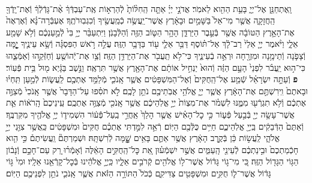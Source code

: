 \documentclass[twoside, openany, parskip=half, 11pt]{book}
\begin{document}
\begin{footnotesize}
\begin{multicols}{2}
\\
וָֽאֶתְחַנַּ֖ן אֶל־יְיָ֑ בָּעֵ֥ת הַהִ֖וא לֵאמֹֽר׃ אֲדֹנָ֣י יְיָ֗ אַתָּ֤ה הַֽחִלּ֨וֹתָ֙ לְֿהַרְא֣וֹת אֶֽת־עַבְדְּֿךָ֔ אֶ֨ת־גָּדְֿלְֿךָ֔ וְֿאֶת־יָֽדְֿךָ֖ הַֽחֲזָקָ֑ה אֲשֶׁ֤ר מִי־אֵל֙ בַּשָּׁמַ֣יִם וּבָאָ֔רֶץ אֲשֶׁר־יַֽעֲשֶׂ֥ה כְֿמַֽעֲשֶׂ֖יךָ וְֿכִגְבֽוּרֹתֶֽךָ׃ אֶעְבְּֿרָה־נָּ֗א וְֿאֶרְאֶה֙ אֶת־הָאָ֣רֶץ הַטּוֹבָ֔ה אֲשֶׁ֖ר בְּֿעֵ֣בֶר הַיַּרְדֵּ֑ן הָהָ֥ר הַטּ֛וֹב הַזֶּ֖ה וְֿהַלְּֿבָנֹֽן׃  וַיִּתְעַבֵּ֨ר יְיָ֥ בִּי֙ לְֿמַ֣עַנְכֶ֔ם וְֿלֹ֥א שָׁמַ֖ע אֵלָ֑י וַיֹּ֨אמֶר יְיָ֤ אֵלַי֙ רַב־לָ֔ךְ אַל־תּ֗וֹסֶף דַּבֵּ֥ר אֵלַ֛י ע֖וֹד בַּדָּבָ֥ר הַזֶּֽה׃ עֲלֵ֣ה רֹ֣אשׁ הַפִּסְגָּ֗ה וְֿשָׂ֥א עֵינֶ֛יךָ יׇׇׇׇׇׇָ֧מָּה וְֿצָפֹ֛נָה וְֿתֵימָ֥נָה וּמִזְרָ֖חָה וּרְאֵ֣ה בְֿעֵינֶ֑יךָ כִּי־לֹ֥א תַֽעֲבֹ֖ר אֶת־הַיַּרְדֵּ֥ן הַזֶּֽה׃ וְֿצַ֥ו אֶת־יְֿהוֹשֻׁ֖עַ וְֿחַזְּֿקֵ֣הוּ וְֿאַמְּֿצֵ֑הוּ כִּי־ה֣וּא יַֽעֲבֹ֗ר לִפְנֵי֙ הָעָ֣ם הַזֶּ֔ה וְֿהוּא֙ יַנְחִ֣יל אוֹתָ֔ם אֶת־הָאָ֖רֶץ אֲשֶׁ֥ר תִּרְאֶֽה׃ וַנֵּ֣שֶׁב בַּגָּ֔יְא מ֖וּל בֵּ֥ית פְּֿעֽוֹר׃ \textbf{פ}
וְֿעַתָּ֣ה יִשְׂרָאֵ֗ל שְֿׁמַ֤ע אֶל־הַֽחֻקִּים֙ וְֿאֶל־הַמִּשְׁפָּטִ֔ים אֲשֶׁ֧ר אָֽנֹכִ֛י מְֿלַמֵּ֥ד אֶתְכֶ֖ם לַֽעֲשׂ֑וֹת לְֿמַ֣עַן תִּֽחְי֗וּ וּבָאתֶם֙ וִֽירִשְׁתֶּ֣ם אֶת־הָאָ֔רֶץ אֲשֶׁ֧ר יְיָ֛ אֱלֹהֵ֥י אֲבֹֽתֵיכֶ֖ם נֹתֵ֥ן לָכֶֽם׃ לֹ֣א תֹסִ֗פוּ עַל־הַדָּבָר֙ אֲשֶׁ֤ר אָֽנֹכִי֙ מְֿצַוֶּ֣ה אֶתְכֶ֔ם וְֿלֹ֥א תִגְרְֿע֖וּ מִמֶּ֑נּוּ לִשְׁמֹ֗ר אֶת־מִצְוֹת֙ יְיָ֣ אֱלֹֽהֵיכֶ֔ם אֲשֶׁ֥ר אָֽנֹכִ֖י מְֿצַוֶּ֥ה אֶתְכֶֽם׃ עֵֽינֵיכֶם֙ הָֽרֹא֔וֹת אֵ֛ת אֲשֶׁר־עָשָׂ֥ה יְיָ֖ בְּֿבַ֣עַל פְּֿע֑וֹר כִּ֣י כׇל־הָאִ֗ישׁ אֲשֶׁ֤ר הָלַךְ֙ אַֽחֲרֵ֣י בַֽעַל־פְּֿֿע֔וֹר הִשְׁמִיד֛וֹ יְיָ֥ אֱלֹהֶ֖יךָ מִקִּרְבֶּֽךָ׃ וְֿאַתֶּם֙ הַדְּֿבֵקִ֔ים בַּֽיְיָ֖ אֱלֹֽהֵיכֶ֑ם חַיִּ֥ים כֻּלְּֿכֶ֖ם הַיּֽוֹם׃  רְֿאֵ֣ה לִמַּ֣דְתִּי אֶתְכֶ֗ם חֻקִּים֙ וּמִשְׁפָּטִ֔ים כַּֽאֲשֶׁ֥ר צִוַּ֖נִי יְיָ֣ אֱלֹהָ֑י לַֽעֲשׂ֣וֹת כֵּ֔ן בְּֿקֶ֣רֶב הָאָ֔רֶץ אֲשֶׁ֥ר אַתֶּ֛ם בָּאִ֥ים שׇׇׇׇׇׇָׁ֖מָּה לְֿרִשְׁתָּֽהּ׃ וּשְׁמַרְתֶּם֘ וַֽעֲשִׂיתֶם֒ כִּ֣י הִ֤וא חָכְֿמַתְכֶם֙ וּבִ֣ינַתְכֶ֔ם לְֿעֵינֵ֖י הָֽעַמִּ֑ים אֲשֶׁ֣ר יִשְׁמְֿע֗וּן אֵ֚ת כׇּל־הַֽחֻקִּ֣ים הָאֵ֔לֶּה וְֿאָמְֿר֗וּ רַ֚ק עַם־חָכָ֣ם וְֿנָב֔וֹן הַגּ֥וֹי הַגָּד֖וֹל הַזֶּֽה׃ כִּ֚י מִי־ג֣וֹי גָּד֔וֹל אֲשֶׁר־ל֥וֹ אֱלֹהִ֖ים קְֿרֹבִ֣ים אֵלָ֑יו כַּֽיְיָ֣ אֱלֹהֵ֔ינוּ בְּֿכׇל־קָרְֿאֵ֖נוּ אֵלָֽיו׃ וּמִי֙ גּ֣וֹי גָּד֔וֹל אֲשֶׁר־ל֛וֹ חֻקִּ֥ים וּמִשְׁפָּטִ֖ים צַדִּיקִ֑ם כְּֿכֹל֙ הַתּוֹרָ֣ה הַזֹּ֔את אֲשֶׁ֧ר אָֽנֹכִ֛י נֹתֵ֥ן לִפְנֵיכֶ֖ם הַיּֽוֹם׃


\end{multicols}
\end{footnotesize}
\end{document}
